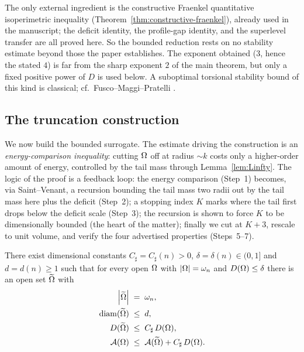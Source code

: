 \begin{remark}\label{rem:seed-status}
The only external ingredient is the constructive Fraenkel quantitative
isoperimetric inequality (Theorem~\ref{thm:constructive-fraenkel}), already used
in the manuscript; the deficit identity, the profile-gap identity, and the
superlevel transfer are all proved here. So the bounded reduction rests on no stability estimate
beyond those the paper establishes. The exponent obtained ($3$, hence the
stated $4$) is far from the sharp exponent $2$ of the main theorem, but only
a fixed positive power of $D$ is used below. A suboptimal torsional stability
bound of this kind is classical; cf.\ Fusco--Maggi--Pratelli \cite{FMP}.
\end{remark}

\subsection{The truncation construction}\label{ssec:truncation}

We now build the bounded surrogate. The estimate driving the construction
is an \emph{energy-comparison inequality}: cutting $\Omega$ off at radius
$\sim k$ costs only a higher-order amount of energy, controlled by the
tail mass through Lemma~\ref{lem:Linfty}. The logic of the proof is a
feedback loop: the energy comparison (Step~1) becomes, via Saint--Venant,
a recursion bounding the tail mass two radii out by the tail mass here
plus the deficit (Step~2); a stopping index $K$ marks where the tail
first drops below the deficit scale (Step~3); the recursion is shown to
force $K$ to be dimensionally bounded (the heart of the matter); finally
we cut at $K+3$, rescale to unit volume, and verify the four advertised
properties (Steps~5--7).

\begin{lemma}\label{lem:truncation}
There exist dimensional constants $C_\sharp=C_\sharp(n)>0$,
$\delta=\delta(n)\in(0,1]$ and $d=d(n)\ge1$ such that for every open
$\Omega$ with $\left|\Omega\right|=\omega_n$ and $D(\Omega)\le\delta$ there is an open set
$\widetilde{\Omega}$ with
\begin{align}
   \left|\widetilde{\Omega}\right|\;&=\;\omega_n,\label{eq:trunc-vol}\\
   \operatorname{diam}(\widetilde{\Omega})\;&\le\;d,\label{eq:trunc-diam}\\
   D(\widetilde{\Omega})\;&\le\;C_\sharp\,D(\Omega),\label{eq:trunc-D}\\
   \mathcal A(\Omega)\;&\le\;\mathcal A(\widetilde{\Omega})+C_\sharp\,D(\Omega).\label{eq:trunc-A}
\end{align}
\end{lemma}

